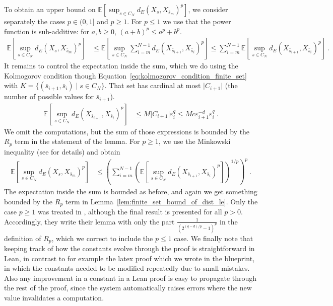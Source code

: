 \documentclass[lean]{Draft}
\begin{document}
To obtain an upper bound on $\mathbb{E}\left[\sup_{s \in C_N} d_E(X_s, X_{\bar{s}_m})^p\right]$, we consider separately the cases $p \in (0, 1]$ and $p \ge 1$.
For $p \le 1$ we use that the power function is sub-additive: for $a, b \ge 0$, $(a + b)^p \le a^p + b^p$.
\begin{align*}
  \mathbb{E}\left[\sup_{s \in C_N} d_E(X_s, X_{\bar{s}_m})^p\right]
  &\le \mathbb{E}\left[\sup_{s \in C_N} \sum_{i=m}^{N-1} d_E(X_{\bar{s}_{i+1}}, X_{\bar{s}_i})^p\right]
  \le \sum_{i=m}^{N-1} \mathbb{E}\left[\sup_{s \in C_N} d_E(X_{\bar{s}_{i+1}}, X_{\bar{s}_i})^p\right]
  \: .
\end{align*}
It remains to control the expectation inside the sum, which we do using the Kolmogorov condition though Equation~\eqref{eq:kolmogorov_condition_finite_set} with $K = \{(\bar{s}_{i+1}, \bar{s}_i) \mid s \in C_N\}$. That set has cardinal at most $\lvert C_{i+1} \rvert$ (the number of possible values for $\bar{s}_{i+1}$).
\begin{align*}
  \mathbb{E}\left[\sup_{s \in C_N} d_E(X_{\bar{s}_{i+1}}, X_{\bar{s}_i})^p\right]
  &\le M \lvert C_{i+1} \rvert \varepsilon_i^q
  \le M c \varepsilon_{i+1}^{-d} \varepsilon_i^{q}
  \: .
\end{align*}
We omit the computations, but the sum of those expressions is bounded by the $R_p$ term in the statement of the lemma.
For $p \ge 1$, we use the Minkowski inequality (see \cite{kratschmer2023kolmogorov} for details) and obtain
\begin{align*}
  \mathbb{E}\left[\sup_{s \in C_N} d_E(X_s, X_{\bar{s}_m})^p\right]
  &\le \left( \sum_{i=m}^{N-1} \left( \mathbb{E}\left[\sup_{s \in C_N} d_E(X_{\bar{s}_{i+1}}, X_{\bar{s}_i})^p\right] \right)^{1/p} \right)^p
  \: .
\end{align*}
The expectation inside the sum is bounded as before, and again we get something bounded by the $R_p$ term in Lemma~\ref{lem:finite_set_bound_of_dist_le}.
Only the case $p \ge 1$ was treated in \cite{kratschmer2023kolmogorov}, although the final result is presented for all $p > 0$.
Accordingly, they write their lemma with only the part $\frac{1}{(2^{(q-d)/p} - 1)^p}$ in the definition of $R_p$, which we correct to include the $p \le 1$ case.
We finally note that keeping track of how the constants evolve through the proof is straightforward in Lean, in contrast to for example the latex proof which we wrote in the blueprint, in which the constants needed to be modified repeatedly due to small mistakes. Also any improvement in a constant in a Lean proof is easy to propagate through the rest of the proof, since the system automatically raises errors where the new value invalidates a computation.
\end{document}
